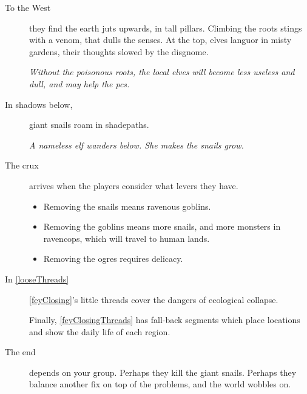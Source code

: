 \begin{multicols}{2}
\begin{description}
  \item[To the West]
  they find the earth juts upwards, in tall pillars.
  Climbing the roots stings with a venom, that dulls the senses.
  At the top, elves languor in misty gardens, their thoughts slowed by the \gls{disgnome}.

  \textit{Without the poisonous roots, the local elves will become less useless and dull, and may help the \glspl{pc}.}
  \item[In shadows below,]
  giant snails roam in \gls{shadepaths}.

  \textit{A nameless elf wanders below.
  She makes the snails grow.}

  \item[The crux]
  arrives when the players consider what levers they have.
  \begin{itemize}
    \item
    Removing the snails means ravenous goblins.
    \item
    Removing the goblins means more snails, and more monsters in \gls{ravencops}, which will travel to human lands.
    \item
    Removing the \glspl{ogre} requires delicacy.
  \end{itemize}
  \item[In \autoref{looseThreads}]
  \autoref{feyClosing}'s little \glspl{thread} cover the dangers of ecological collapse.

  Finally, \autoref{feyClosingThreads} has fall-back \glspl{segment} which place locations and show the daily life of each \gls{region}.

  \item[The end]
  depends on your group.
  Perhaps they kill the giant snails.
  Perhaps they balance another fix on top of the problems, and the world wobbles on.
\end{description}


\end{multicols}
